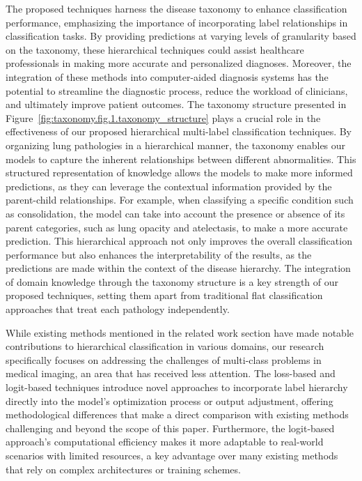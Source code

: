 \documentclass[review,1p,times,numbers]{elsarticle}
\begin{document}
The proposed techniques harness the disease taxonomy to enhance classification performance, emphasizing the importance of incorporating label relationships in classification tasks. By providing predictions at varying levels of granularity based on the taxonomy, these hierarchical techniques could assist healthcare professionals in making more accurate and personalized diagnoses. Moreover, the integration of these methods into computer-aided diagnosis systems has the potential to streamline the diagnostic process, reduce the workload of clinicians, and ultimately improve patient outcomes. The taxonomy structure presented in Figure~\ref{fig:taxonomy.fig.1.taxonomy_structure} plays a crucial role in the effectiveness of our proposed hierarchical multi-label classification techniques. By organizing lung pathologies in a hierarchical manner, the taxonomy enables our models to capture the inherent relationships between different abnormalities. This structured representation of knowledge allows the models to make more informed predictions, as they can leverage the contextual information provided by the parent-child relationships. For example, when classifying a specific condition such as consolidation, the model can take into account the presence or absence of its parent categories, such as lung opacity and atelectasis, to make a more accurate prediction. This hierarchical approach not only improves the overall classification performance but also enhances the interpretability of the results, as the predictions are made within the context of the disease hierarchy. The integration of domain knowledge through the taxonomy structure is a key strength of our proposed techniques, setting them apart from traditional flat classification approaches that treat each pathology independently.

While existing methods mentioned in the related work section have made notable contributions to hierarchical classification in various domains, our research specifically focuses on addressing the challenges of multi-class problems in medical imaging, an area that has received less attention. The loss-based and logit-based techniques introduce novel approaches to incorporate label hierarchy directly into the model's optimization process or output adjustment, offering methodological differences that make a direct comparison with existing methods challenging and beyond the scope of this paper. Furthermore, the logit-based approach's computational efficiency makes it more adaptable to real-world scenarios with limited resources, a key advantage over many existing methods that rely on complex architectures or training schemes.
\end{document}
